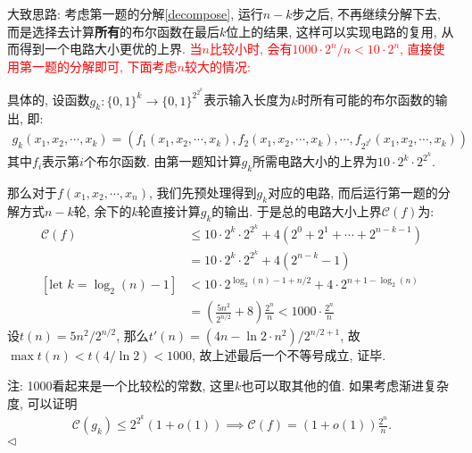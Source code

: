 \documentclass[11pt]{article}
\newcommand{\1}{\mathbf{1}}
\newenvironment{answer}[1][Answer]{\begin{trivlist}
\item[\hskip \labelsep{\bfseries\itshape#1.}\hskip \labelsep]}{\hfill$\lhd$\end{trivlist}}
\begin{document}
\begin{answer}
    大致思路: 考虑第一题的分解\eqref{decompose}, 运行$n-k$步之后, 不再继续分解下去, 而是选择去计算\textbf{所有}的布尔函数在最后$k$位上的结果, 这样可以实现电路的复用, 从而得到一个电路大小更优的上界. \textcolor{red}{当$n$比较小时, 会有$1000\cdot 2^n/n < 10\cdot 2^n$, 直接使用第一题的分解即可, 下面考虑$n$较大的情况:  }
    
    具体的, 设函数$g_k:\{0,1\}^k \rightarrow \{0,1\}^{2^{2^k}}$表示输入长度为$k$时所有可能的布尔函数的输出, 即:
    \begin{align*}
        g_k(x_1, x_2, \cdots, x_k) = (f_1(x_1, x_2, \cdots, x_k), f_2(x_1, x_2, \cdots, x_k), \cdots, f_{2^{2^k}}(x_1, x_2, \cdots, x_k))
    \end{align*}
    其中$f_i$表示第$i$个布尔函数. 由第一题知计算$g_k$所需电路大小的上界为$10\cdot 2^k\cdot 2^{2^k}$. 

    那么对于$f(x_1, x_2, \cdots, x_n)$, 我们先预处理得到$g_k$对应的电路, 而后运行第一题的分解方式$n-k$轮, 余下的$k$轮直接计算$g_k$的输出. 于是总的电路大小上界$\mathcal{C}(f)$为:
    \begin{align*}
        \mathcal{C}(f) &\le 10\cdot 2^{k}\cdot 2^{2^{k}} + 4 (2^0 + 2^1 + \cdots + 2^{n-k-1}) \\
         &= 10\cdot 2^{k}\cdot 2^{2^{k}} + 4(2^{n-k} - 1) \\
         [\text{let } k = \log_2(n)-1] &< 10\cdot 2^{\log_2(n) - 1 + n/2} + 4\cdot 2^{n + 1-\log_2(n)} \\ 
         &= \left(\frac{5n^2}{2^{n/2}} + 8\right)\frac{2^n}{n} < 1000\cdot \frac{2^n}{n}
    \end{align*}
    设$t(n) = 5n^2/2^{n/2}$, 那么$t'(n) = (4n - \ln 2\cdot n^2)/2^{n/2+1}$, 故$\max t(n) < t(4/\ln 2) < 1000$, 故上述最后一个不等号成立, 证毕.
    
    注: 1000看起来是一个比较松的常数, 这里$k$也可以取其他的值. 如果考虑渐进复杂度, 可以证明
    \begin{align*}
        \mathcal{C}(g_k) \le 2^{2^k}(1 + o(1)) \implies  \mathcal{C}(f) = (1 + o(1))\frac{2^n}{n}.
    \end{align*}
\end{answer}
\end{document}

